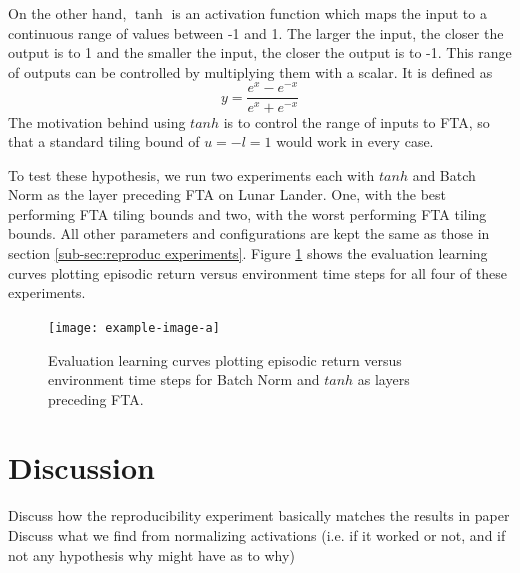 \documentclass{article}
\begin{document}
On the other hand, $\tanh$ is an activation function which maps the input to a continuous range of values between -1 and 1. 
The larger the input, the closer the output is to 1 and the smaller the input, the closer the output is to -1. 
This range of outputs can be controlled by multiplying them with a scalar. 
It is defined as 
 \begin{equation}
    y = \frac{e^x-e^{-x}}{e^x+e^{-x}}
    \label{eq:tanh}
 \end{equation}
The motivation behind using $tanh$ is to control the range of inputs to FTA, so that a standard tiling bound of $u = -l = 1$ would work in every case.

To test these hypothesis, we run two experiments each with $tanh$ and Batch Norm as the layer preceding FTA on Lunar Lander. 
One, with the best performing FTA tiling bounds and two, with the worst performing FTA tiling bounds. 
All other parameters and configurations are kept the same as those in section \ref{sub-sec:reproduc experiments}. 
Figure \ref{fig:bnvtanh} shows the evaluation learning curves plotting episodic return versus environment time steps for all four of these experiments.

\begin{figure}[h]
    \centering
    \texttt{[image: example-image-a]}
    \caption{Evaluation learning curves plotting episodic return versus environment time steps for Batch Norm and $tanh$ as layers preceding FTA.}
    \label{fig:bnvtanh}
\end{figure}


\section{Discussion} \label{sec:discussion}
Discuss how the reproducibility experiment basically matches the results in \cite[]{pan2019fuzzy} paper
Discuss what we find from normalizing activations (i.e. if it worked or not, and if not any hypothesis why might have as to why)


\newpage

\end{document}
